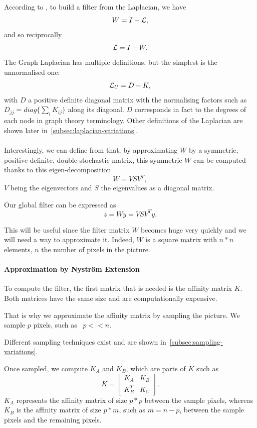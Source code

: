 \paragraph{}
According to \cite{modern_tour_2013}, to build a filter from the Laplacian, we have
\[W = I - \operatorname{\mathcal{L}},\]
and so reciprocally
\[\operatorname{\mathcal{L}} = I - W.\]
The Graph Laplacian has multiple definitions, but the simplest is the unnormalised one:
\[\operatorname{\mathcal{L}}_U = D - K,\]
with \(D\) a positive definite diagonal matrix with the normalising factors such as \(D_{jj} = diag\{\sum_i K_{ij}\}\) along its diagonal.
\(D\) corresponds in fact to the degrees of each node in graph theory terminology.
Other definitions of the Laplacian are shown later in~\ref{subsec:laplacian-variations}.

\paragraph{}
Interestingly, we can define from \cite{glide_2014} that, by approximating \(W\) by a symmetric, positive definite, double stochastic matrix, this symmetric \(W\) can be computed thanks to this eigen-decomposition
\[W = VSV^T,\]
\(V\) being the eigenvectors and \(S\) the eigenvalues as a diagonal matrix.

Our global filter can be expressed as
\[z = Wy = VSV^Ty.\]

This will be useful since the filter matrix \(W\) becomes huge very quickly and we will need a way to approximate it. Indeed, \(W\) is a square matrix with \(n*n\) elements, \(n\) the number of pixels in the picture.

\paragraph{Approximation by Nystr\"om Extension}

To compute the filter, the first matrix that is needed is the affinity matrix \(K\).
Both matrices have the same size and are computationally expensive.

That is why we approximate the affinity matrix by sampling the picture.
We sample \(p\) pixels, such as  \(p << n\).

Different sampling techniques exist and are shown in~\ref{subsec:sampling-variations}.

Once sampled, we compute \(K_A\) and \(K_B\), which are parts of \(K\) such as
\[
 K = \begin{bmatrix}
  K_A & K_B \\
  K_B^T & K_C
 \end{bmatrix}.
\]
\(K_A\) represents the affinity matrix of size \(p*p\) between the sample pixels, whereas \(K_B\) is the affinity matrix of size \(p*m\), such as \(m = n-p\), between the sample pixels and the remaining pixels.

